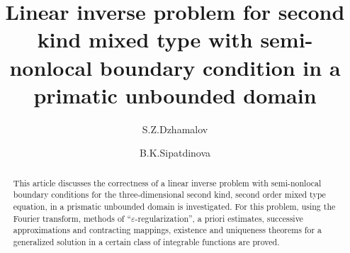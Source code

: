 \begin{englishtitle} %
\title{Linear inverse problem for second kind mixed type with semi-nonlocal boundary condition in a primatic unbounded domain}
\author{S.Z.Dzhamalov \and  B.K.Sipatdinova
}

\maketitle

\begin{abstract}
This article discusses the correctness of a linear inverse problem with semi-nonlocal boundary conditions for the three-dimensional second kind, second order mixed type equation, in a prismatic unbounded domain is investigated. For this problem, using the Fourier transform, methods of ``$\varepsilon$-regularization'', a priori estimates, successive approximations and contracting mappings, existence and uniqueness theorems for a generalized solution in a certain class of integrable functions are proved.

\end{abstract}
\end{englishtitle}


\iffalse
%
%


\documentclass[12pt]{llncs}


\usepackage{iftex}

